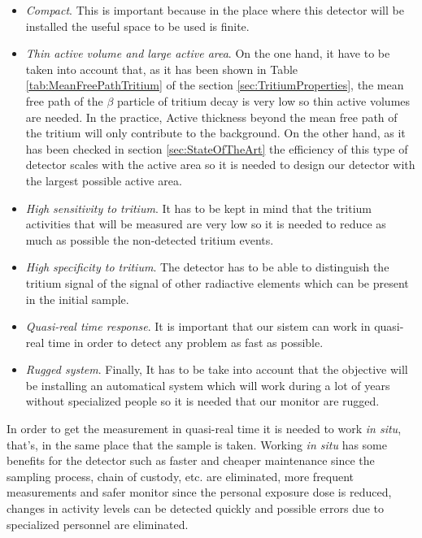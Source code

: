 \begin{itemize}

\item{} \textit{Compact}. This is important because in the place where this detector will be installed the useful space to be used is finite.

\item{} \textit{Thin active volume and large active area}. On the one hand, it have to be taken into account that, as it has been shown in Table \ref{tab:MeanFreePathTritium} of the section \ref{sec:TritiumProperties}, the mean free path of the $\beta$ particle of tritium decay is very low so thin active volumes are needed. In the practice, Active thickness beyond the mean free path of the tritium will only contribute to the background. On the other hand, as it has been checked in section \ref{sec:StateOfTheArt} the efficiency of this type of detector scales with the active area so it is needed to design our detector with the largest possible active area.

\item{} \textit{High sensitivity to tritium}. It has to be kept in mind that the tritium activities that will be measured are very low so it is needed to reduce as much as possible the non-detected tritium events.

\item{} \textit{High specificity to tritium}. The detector has to be able to distinguish the tritium signal of the signal of other radiactive elements which can be present in the initial sample.

\item{} \textit{Quasi-real time response}. It is important that our sistem can work in quasi-real time in order to detect any problem as fast as possible. 

\item{} \textit{Rugged system}. Finally, It has to be take into account that the objective will be installing an automatical system which will work during a lot of years without specialized people so it is needed that our monitor are rugged. 

\end{itemize}

In order to get the measurement in quasi-real time it is needed to work \textit{in situ}, that's, in the same place that the sample is taken. Working \textit{in situ} has some benefits for the detector such as faster and cheaper maintenance since the sampling process, chain of custody, etc. are eliminated, more frequent measurements and safer monitor since the personal exposure dose is reduced, changes in activity levels can be detected quickly and possible errors due to specialized personnel are eliminated.


